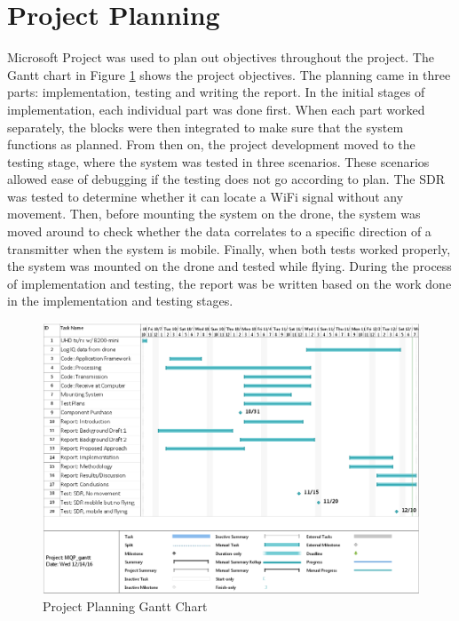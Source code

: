 \section{Project Planning}
Microsoft Project was used to plan out objectives throughout the project. The Gantt chart in Figure \ref{fig:gantt_chart} shows the project objectives. The planning came in three parts: implementation, testing and writing the report. In the initial stages of implementation, each individual part was done first. When each part worked separately, the blocks were then integrated to make sure that the system functions as planned. From then on, the project development moved to the testing stage, where the system was tested in three scenarios. These scenarios allowed ease of debugging if the testing does not go according to plan. The SDR was tested to determine whether it can locate a WiFi signal without any movement. Then, before mounting the system on the drone, the system was moved around to check whether the data correlates to a specific direction of a transmitter when the system is mobile. Finally, when both tests worked properly, the system was mounted on the drone and tested while flying. During the process of implementation and testing, the report was be written based on the work done in the implementation and testing stages.
\begin{figure}[ht]
\centering
\includegraphics[width=\textwidth]{img/oct_gantt_chart.png}
\caption{Project Planning Gantt Chart}
\label{fig:gantt_chart}
\end{figure}

